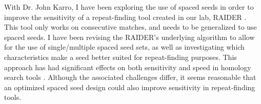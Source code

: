 \documentclass[12pt]{article}
\begin{document}

With Dr. John Karro, I have been
exploring the use of spaced seeds in order to improve the sensitivity of a repeat-finding tool created in our lab, RAIDER \cite{figueroa2013raiderpaper}. 
This tool only works on consecutive matches, and needs to be generalized to use spaced seeds.
I have been revising the RAIDER's underlying algorithm
to allow for the use of single/multiple spaced seed sets, as well as investigating which characteristics make a seed better suited for repeat-finding purposes. 
This approach has had significant effects on both sensitivity and speed in homology search tools \cite{saha2008computational, ma2002patternhunter}. 
Although the associated challenges differ, it seems reasonable that an optimized spaced seed design could also improve sensitivity in repeat-finding tools.
\end{document}
